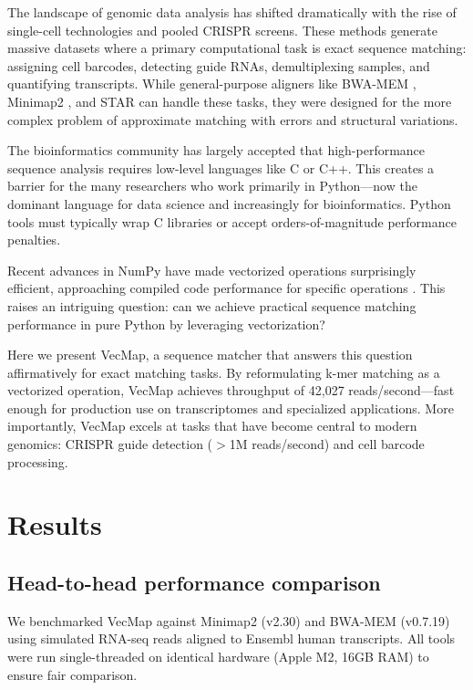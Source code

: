 \documentclass[12pt]{article}
\begin{document}
The landscape of genomic data analysis has shifted dramatically with the rise of single-cell technologies and pooled CRISPR screens. These methods generate massive datasets where a primary computational task is exact sequence matching: assigning cell barcodes, detecting guide RNAs, demultiplexing samples, and quantifying transcripts. While general-purpose aligners like BWA-MEM \citep{li2013aligning}, Minimap2 \citep{li2018minimap2}, and STAR \citep{dobin2013star} can handle these tasks, they were designed for the more complex problem of approximate matching with errors and structural variations.

The bioinformatics community has largely accepted that high-performance sequence analysis requires low-level languages like C or C++. This creates a barrier for the many researchers who work primarily in Python---now the dominant language for data science and increasingly for bioinformatics. Python tools must typically wrap C libraries or accept orders-of-magnitude performance penalties.

Recent advances in NumPy have made vectorized operations surprisingly efficient, approaching compiled code performance for specific operations \citep{harris2020array}. This raises an intriguing question: can we achieve practical sequence matching performance in pure Python by leveraging vectorization?

Here we present VecMap, a sequence matcher that answers this question affirmatively for exact matching tasks. By reformulating k-mer matching as a vectorized operation, VecMap achieves throughput of 42,027 reads/second---fast enough for production use on transcriptomes and specialized applications. More importantly, VecMap excels at tasks that have become central to modern genomics: CRISPR guide detection ($>$1M reads/second) and cell barcode processing.

\section{Results}

\subsection{Head-to-head performance comparison}

We benchmarked VecMap against Minimap2 (v2.30) and BWA-MEM (v0.7.19) using simulated RNA-seq reads aligned to Ensembl human transcripts. All tools were run single-threaded on identical hardware (Apple M2, 16GB RAM) to ensure fair comparison.
\end{document}
